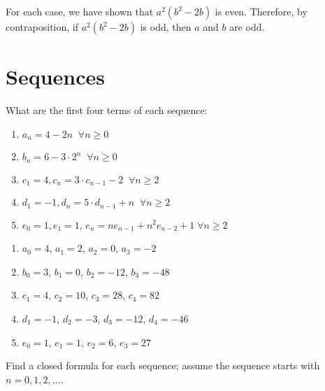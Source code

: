 \begin{questions}
\begin{solution}
For each case, we have shown that $a^2(b^2 - 2b)$ is even.  Therefore, by contraposition, if $a^2(b^2 - 2b)$ is odd, then $a$ and $b$ are odd.
\end{solution}




\section*{Sequences} 

  What are the first four terms of each sequence: 


\begin{minipage}{0.5\textwidth}
\begin{enumerate}[label=(\alph*),itemsep=0pt,parsep=0pt,topsep=0pt]
  \item $a_n = 4-2n\;\;\forall n \geq 0$ \hspace{0.25in} 
  \item $b_n = 6- 3\cdot 2^n \;\;\forall n \geq 0$
  \item $c_1 = 4,  c_n = 3\cdot c_{n-1} - 2 \;\; \forall n \geq 2$ 
  \item $d_1 = -1, d_n = 5\cdot d_{n-1} + n\;\; \forall n \geq 2$ 
  \item $e_0 = 1, e_1 = 1$, $e_n = ne_{n-1} + n^2e_{n-2} + 1\;\forall n \geq 2$
\end{enumerate}
\end{minipage}
% 
\begin{minipage}{0.5\textwidth}
\begin{solution}
\begin{enumerate}[label=(\alph*),itemsep=0pt,parsep=0pt,topsep=0pt]
  \item $a_0 = 4$, $a_1 = 2$, $a_2 = 0$, $a_3 = -2$
  \item $b_0 = 3$, $b_1 = 0$, $b_2 = -12$, $b_3 = -48$
  \item $c_1 = 4$, $c_2 = 10$, $c_3 = 28$, $c_4 = 82$
  \item $d_1 = -1$, $d_2 = -3$, $d_3 = -12$, $d_4 = -46$ 
  \item $e_0 = 1$, $e_1 = 1$, $e_2 = 6$, $e_3 = 27$
\end{enumerate}
\end{solution}
\end{minipage}



 Find a closed formula for each sequence; assume the sequence starts with $n=0, 1, 2, \ldots$. 


\end{questions}
